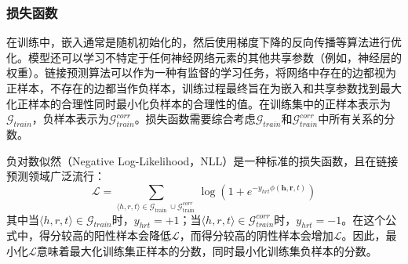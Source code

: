 \documentclass[twocolumn]{article}
\begin{document}
\subsubsection{损失函数}
在训练中，嵌入通常是随机初始化的，然后使用梯度下降的反向传播等算法进行优化。模型还可以学习不特定于任何神经网络元素的其他共享参数（例如，神经层的权重）。链接预测算法可以作为一种有监督的学习任务，将网络中存在的边都视为正样本，不存在的边都当作负样本，训练过程最终旨在为嵌入和共享参数找到最大化正样本的合理性同时最小化负样本的合理性的值。在训练集中的正样本表示为$\mathcal{G}_{train}$，负样本表示为$\mathcal{G}_{train}^{corr}$。损失函数需要综合考虑$\mathcal{G}_{train}$和$\mathcal{G}_{train}^{corr}$中所有关系的分数。\par
负对数似然（Negative Log-Likelihood，NLL）是一种标准的损失函数，且在链接预测领域广泛流行：
$$\mathcal{L}=\sum_{\langle h, r, t\rangle \in \mathcal{G}_{\text {train }} \cup \mathcal{G}_{\text {train }}^{c o r r}} \log \left(1+e^{-y_{h r t} \phi(\boldsymbol{h}, \boldsymbol{r}, t)}\right)$$
其中当$\langle h, r, t\rangle \in \mathcal{G}_{train}$时，$y_{hrt}=+1$；当$\langle h, r, t\rangle \in \mathcal{G}_{train}^{corr}$时，$y_{hrt}=-1$。在这个公式中，得分较高的阳性样本会降低$\mathcal{L}$，而得分较高的阴性样本会增加$\mathcal{L}$。因此，最小化$\mathcal{L}$意味着最大化训练集正样本的分数，同时最小化训练集负样本的分数。\par
\end{document}
